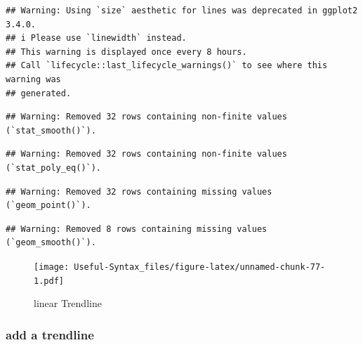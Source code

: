 \documentclass[
]{article}
\begin{document}
\begin{verbatim}
## Warning: Using `size` aesthetic for lines was deprecated in ggplot2 3.4.0.
## i Please use `linewidth` instead.
## This warning is displayed once every 8 hours.
## Call `lifecycle::last_lifecycle_warnings()` to see where this warning was
## generated.
\end{verbatim}

\begin{verbatim}
## Warning: Removed 32 rows containing non-finite values (`stat_smooth()`).
\end{verbatim}

\begin{verbatim}
## Warning: Removed 32 rows containing non-finite values (`stat_poly_eq()`).
\end{verbatim}

\begin{verbatim}
## Warning: Removed 32 rows containing missing values (`geom_point()`).
\end{verbatim}

\begin{verbatim}
## Warning: Removed 8 rows containing missing values (`geom_smooth()`).
\end{verbatim}

\begin{figure}
\centering
\texttt{[image: Useful-Syntax\_files/figure-latex/unnamed-chunk-77-1.pdf]}
\caption{\label{fig:unnamed-chunk-77}linear Trendline}
\end{figure}

\hypertarget{add-a-trendline-1}{%
\subsubsection{add a trendline}\label{add-a-trendline-1}}
\end{document}
